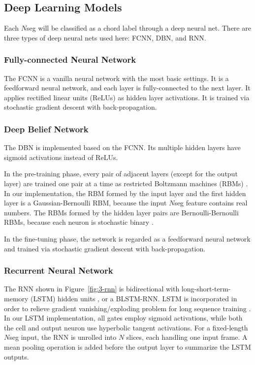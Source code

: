 \subsection{Deep Learning Models} \label{sec:3-dlmodel}

Each $N$seg will be classified as a chord label through a deep neural net. There are three types of deep neural nets used here:  FCNN, DBN, and RNN.

\subsubsection{Fully-connected Neural Network}

The FCNN is a vanilla neural network with the most basic settings. It is a feedforward neural network, and each layer is fully-connected to the next layer. It applies rectified linear units (ReLUs) as hidden layer activations. It is trained via stochastic gradient descent with back-propagation.

\subsubsection{Deep Belief Network}

The DBN is implemented based on the FCNN. Its multiple hidden layers have sigmoid activations instead of ReLUs.

In the pre-training phase, every pair of adjacent layers (except for the output layer) are trained one pair at a time as restricted Boltzmann machines (RBMs) \cite{hinton2006fast}. In our implementation, the RBM formed by the input layer and the first hidden layer is a Gaussian-Bernoulli RBM, because the input $N$seg feature contains real numbers. The RBMs formed by the hidden layer pairs are Bernoulli-Bernoulli RBMs, because each neuron is stochastic binary \cite{hinton2006reducing}.

In the fine-tuning phase, the network is regarded as a feedforward neural network and trained via stochastic gradient descent with back-propagation.

\subsubsection{Recurrent Neural Network}

The RNN shown in Figure~\ref{fig:3-rnn} is bidirectional with long-short-term-memory (LSTM) hidden units \cite{hochreiter1997long}, or a BLSTM-RNN. LSTM is incorporated in order to relieve gradient vanishing/exploding problem for long sequence training \cite{bengio2009learning}. In our LSTM implementation, all gates employ sigmoid activations, while both the cell and output neuron use hyperbolic tangent activations. For a fixed-length $N$seg input, the RNN is unrolled into $N$ slices, each handling one input frame. A mean pooling operation is added before the output layer to summarize the LSTM outputs.

